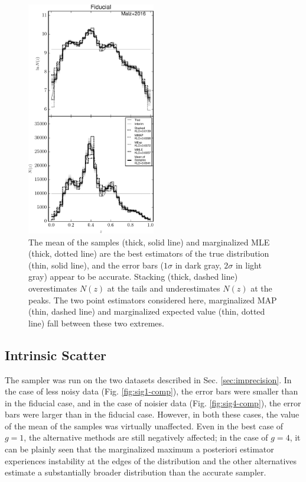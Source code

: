 \documentclass[preprint]{aastex}
\begin{document}
\begin{figure}
\includegraphics[width=0.5\textwidth]{figs/null/comps.pdf}
\caption{The mean of the samples (thick, solid line) and marginalized MLE 
(thick, dotted line) are the best estimators of the true distribution (thin, 
solid line), and the error bars ($1\sigma$ in dark gray, $2\sigma$ in light 
gray) appear to be accurate.  Stacking (thick, dashed line) overestimates 
$N(z)$ at the tails and underestimates $N(z)$ at the peaks.  The two point 
estimators considered here, marginalized MAP (thin, dashed line) and 
marginalized expected value (thin, dotted line) fall between these two 
extremes.}
\label{fig:null-comp}
\end{figure}

\subsection{Intrinsic Scatter}
\label{sec:noisy}

The sampler was run on the two datasets described in Sec. 
\ref{sec:imprecision}.  In the case of less noisy data (Fig. 
\ref{fig:sig1-comp}), the error bars were smaller than in the fiducial case, 
and in the case of noisier data (Fig. \ref{fig:sig4-comp}), the error bars were 
larger than in the fiducial case.  However, in both these cases, the value of 
the mean of the samples was virtually unaffected.  Even in the best case of 
$g=1$, the alternative methods are still negatively affected; in the case of 
$g=4$, it can be plainly seen that the marginalized maximum a posteriori 
estimator experiences instability at the edges of the distribution and the 
other alternatives estimate a substantially broader distribution than the 
accurate sampler.
\end{document}
